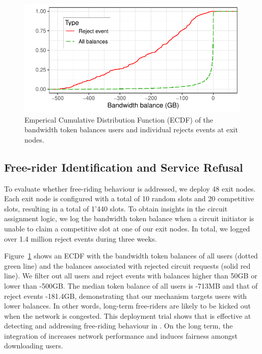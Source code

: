 \begin{figure}[t]
	\centering
	\includegraphics[width=.8\linewidth]{trustchain/assets/exit_node_rejects}
	\caption{Emperical Cumulative Distribution Function (ECDF) of the bandwidth token balances users and individual rejects events at exit nodes.}
	\label{fig:exit_node_rejects}
\end{figure}

\subsection{Free-rider Identification and Service Refusal}
To evaluate whether free-riding behaviour is addressed, we deploy 48 \Tribler{} exit nodes.
Each exit node is configured with a total of 10 random slots and 20 competitive slots, resulting in a total of 1'440 slots.
To obtain insights in the circuit assignment logic, we log the bandwidth token balance when a circuit initiator is unable to claim a competitive slot at one of our exit nodes.
In total, we logged over 1.4 million reject events during three weeks.

Figure~\ref{fig:exit_node_rejects} shows an ECDF with the bandwidth token balances of all users (dotted green line) and the balances associated with rejected circuit requests (solid red line).
We filter out all users and reject events with balances higher than 50GB or lower than -500GB.
The median token balance of all users is -713MB and that of reject events -181.4GB, demonstrating that our mechanism targets users with lower balances.
In other words, long-term free-riders are likely to be kicked out when the network is congested.
This deployment trial shows that \ModelName{} is effective at detecting and addressing free-riding behaviour in \Tribler{}.
On the long term, the integration of \ModelName{} increases network performance and induces fairness amongst downloading users.


